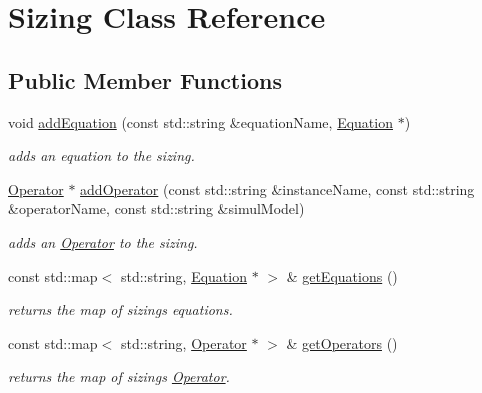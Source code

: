 \hypertarget{class_open_chams_1_1_sizing}{}\section{Sizing Class Reference}
\label{class_open_chams_1_1_sizing}
\subsection*{Public Member Functions}
\begin{DoxyCompactItemize}
\item 
void \hyperlink{class_open_chams_1_1_sizing_a01f8823628bb567d1c463c8bef314ca7}{add\+Equation} (const std\+::string \&equation\+Name, \hyperlink{class_open_chams_1_1_equation}{Equation} $\ast$)
\begin{DoxyCompactList}\small\item\em adds an equation to the sizing. \end{DoxyCompactList}\item 
\hyperlink{class_open_chams_1_1_operator}{Operator} $\ast$ \hyperlink{class_open_chams_1_1_sizing_a712e045c11e463cff8411b3d0fd7f732}{add\+Operator} (const std\+::string \&instance\+Name, const std\+::string \&operator\+Name, const std\+::string \&simul\+Model)
\begin{DoxyCompactList}\small\item\em adds an \hyperlink{class_open_chams_1_1_operator}{Operator} to the sizing. \end{DoxyCompactList}\item 
\mbox{\label{class_open_chams_1_1_sizing_aacce59a91d7919a2025c8611184d5bf3}} 
const std\+::map$<$ std\+::string, \hyperlink{class_open_chams_1_1_equation}{Equation} $\ast$ $>$ \& \hyperlink{class_open_chams_1_1_sizing_aacce59a91d7919a2025c8611184d5bf3}{get\+Equations} ()
\begin{DoxyCompactList}\small\item\em returns the map of sizing\textquotesingle{}s equations. \end{DoxyCompactList}\item 
\mbox{\label{class_open_chams_1_1_sizing_ad35c9083b30dac45186f4f0eb49b435d}} 
const std\+::map$<$ std\+::string, \hyperlink{class_open_chams_1_1_operator}{Operator} $\ast$ $>$ \& \hyperlink{class_open_chams_1_1_sizing_ad35c9083b30dac45186f4f0eb49b435d}{get\+Operators} ()
\begin{DoxyCompactList}\small\item\em returns the map of sizing\textquotesingle{}s \hyperlink{class_open_chams_1_1_operator}{Operator}. \end{DoxyCompactList}\item 

\end{DoxyCompactItemize}

